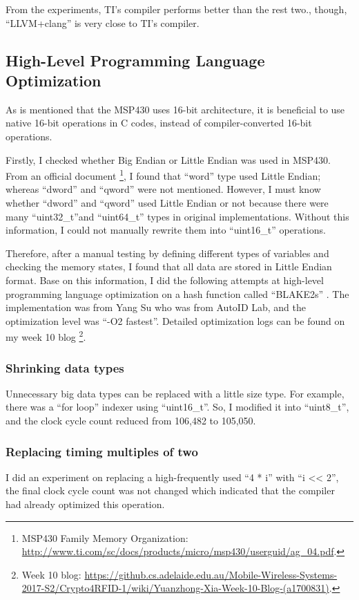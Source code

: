 \documentclass[sigconf, review=false]{acmart}
\begin{document}
From the experiments, TI's compiler performs better than the rest two.,
though, ``LLVM+clang'' is very close to TI's compiler.


\subsection{High-Level Programming Language Optimization}
As is mentioned that the MSP430 uses 16-bit architecture, it is beneficial to use native 16-bit operations in C codes,
instead of compiler-converted 16-bit operations.

Firstly, I checked whether Big Endian or Little Endian was used in MSP430.
From an official document \footnote{MSP430 Family Memory Organization: \url{http://www.ti.com/sc/docs/products/micro/msp430/userguid/ag_04.pdf}.},
I found that ``word'' type used Little Endian; whereas ``dword'' and ``qword'' were not mentioned.
However, I must know whether ``dword'' and ``qword'' used Little Endian or not
because there were many ``uint32\_t''and ``uint64\_t'' types in original implementations.
Without this information, I could not manually rewrite them into ``uint16\_t'' operations.

Therefore, after a manual testing by defining different types of variables and checking the memory states,
I found that all data are stored in Little Endian format.
Base on this information, I did the following attempts at high-level programming language optimization
on a hash function called ``BLAKE2s'' \cite{aumasson2016blake2x}.
The implementation was from Yang Su who was from AutoID Lab, and the optimization level was ``-O2 fastest''.
Detailed optimization logs can be found on my week 10 blog
\footnote{Week 10 blog: \url{https://github.cs.adelaide.edu.au/Mobile-Wireless-Systems-2017-S2/Crypto4RFID-1/wiki/Yuanzhong-Xia-Week-10-Blog-(a1700831)}.}.

\subsubsection{Shrinking data types}
Unnecessary big data types can be replaced with a little size type.
For example, there was a ``for loop'' indexer using ``uint16\_t''.
So, I modified it into ``uint8\_t'', and the clock cycle count reduced from 106,482 to 105,050.

\subsubsection{Replacing timing multiples of two}
I did an experiment on replacing a high-frequently used ``4 * i'' with ``i << 2'',
the final clock cycle count was not changed which indicated that the compiler had already optimized this operation.
\end{document}
